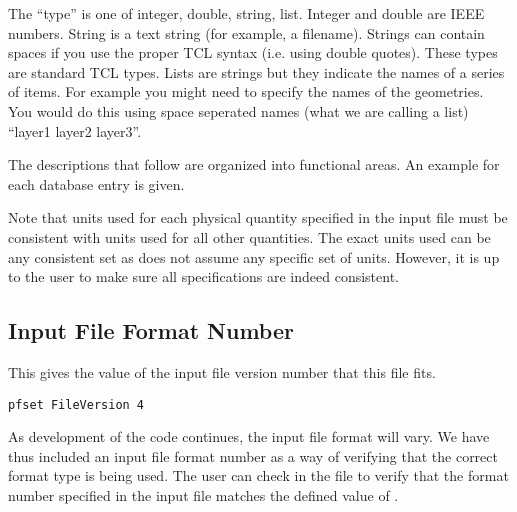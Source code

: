 \vspace{0.25in}
The ``type'' is one of integer, double, string, list.  Integer and double are
IEEE numbers.  String is a text string (for example, a filename).
Strings can contain spaces if you use the proper TCL syntax
(i.e. using double quotes).  These types are standard TCL
types.  Lists are strings but they indicate the names of a series of items.
For example you might need to specify the names of the geometries. You
would do this using space seperated names (what we are calling a list)
``layer1 layer2 layer3''.

The descriptions that follow are organized into functional areas.  An
example for each database entry is given.

Note that units used for each physical quantity specified in the input file
must be consistent with units used for all other quantities.  The exact units
used can be any consistent set as \parflow{} does not assume any specific set
of units.  However, it is up to the user to make sure all specifications are
indeed consistent.


\subsection{Input File Format Number}
\label{Input File Format Number}

{This gives the value of
the input file version number that this file fits.}
\begin{display}\begin{verbatim}
pfset FileVersion 4
\end{verbatim}\end{display}

As development of the \parflow{} code continues, the input file format
will vary.  We have thus included an input file format number as a way
of verifying that the correct format type is being used.  The user can
check in the  file to verify that
the format number specified in the input file matches the defined
value of .


